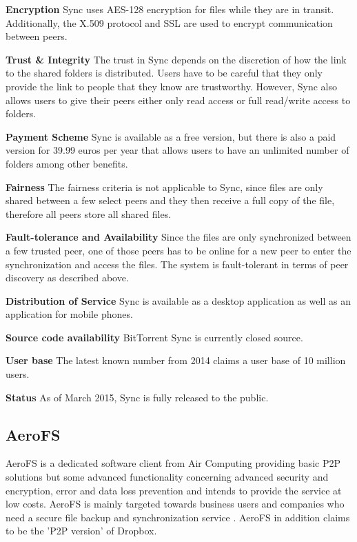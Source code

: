 \textbf{Encryption}
Sync uses AES-128 encryption for files while they are in transit. Additionally, the X.509 protocol and SSL are used to encrypt communication between peers.

\textbf{Trust \& Integrity}
The trust in Sync depends on the discretion of how the link to the shared folders is distributed. Users have to be careful that they only provide the link to people that they know are trustworthy. However, Sync also allows users to give their peers either only read access or full read/write access to folders.

\textbf{Payment Scheme}
Sync is available as a free version, but there is also a paid version for 39.99 euros per year that allows users to have an unlimited number of folders among other benefits.

\textbf{Fairness}
The fairness criteria is not applicable to Sync, since files are only shared between a few select peers and they then receive a full copy of the file, therefore all peers store all shared files.

\textbf{Fault-tolerance and Availability}
Since the files are only synchronized between a few trusted peer, one of those peers has to be online for a new peer to enter the synchronization and access the files. The system is fault-tolerant in terms of peer discovery as described above.

\textbf{Distribution of Service}
Sync is available as a desktop application as well as an application for mobile phones.

\textbf{Source code availability}
BitTorrent Sync is currently closed source.

\textbf{User base}
The latest known number from 2014 claims a user base of 10 million users.

\textbf{Status}
As of March 2015, Sync is fully released to the public.

\subsection{AeroFS}

\label{subsec:Aerofs}
AeroFS is a dedicated software client from Air Computing providing basic P2P solutions but some advanced functionality concerning advanced security and encryption, error and data loss prevention and intends to provide the service at low costs. AeroFS is mainly targeted towards business users and companies who need a secure file backup and synchronization service \cite{aerofs}. AeroFS in addition claims to be the 'P2P version' of Dropbox.

